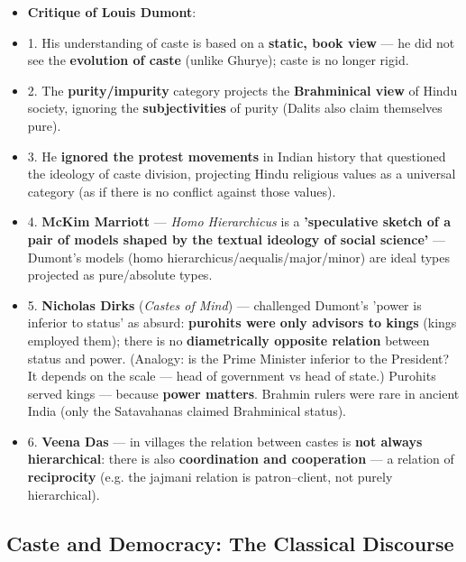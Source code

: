 \begin{CriticalPoint}
\begin{itemize}
\item \textbf{Critique of Louis Dumont}:
\item 1. His understanding of caste is based on a \textbf{static, book view} --- he did not see the \textbf{evolution of caste} (unlike Ghurye); caste is no longer rigid.
\item 2. The \textbf{purity/impurity} category projects the \textbf{Brahminical view} of Hindu society, ignoring the \textbf{subjectivities} of purity (Dalits also claim themselves pure).
\item 3. He \textbf{ignored the protest movements} in Indian history that questioned the ideology of caste division, projecting Hindu religious values as a universal category (as if there is no conflict against those values).
\item 4. \textbf{McKim Marriott} --- \emph{Homo Hierarchicus} is a \textbf{'speculative sketch of a pair of models shaped by the textual ideology of social science'} --- Dumont's models (homo hierarchicus/aequalis/major/minor) are ideal types projected as pure/absolute types.
\item 5. \textbf{Nicholas Dirks} (\emph{Castes of Mind}) --- challenged Dumont's 'power is inferior to status' as absurd: \textbf{purohits were only advisors to kings} (kings employed them); there is no \textbf{diametrically opposite relation} between status and power. (Analogy: is the Prime Minister inferior to the President? It depends on the scale --- head of government vs head of state.) Purohits served kings --- because \textbf{power matters}. Brahmin rulers were rare in ancient India (only the Satavahanas claimed Brahminical status).
\item 6. \textbf{Veena Das} --- in villages the relation between castes is \textbf{not always hierarchical}: there is also \textbf{coordination and cooperation} --- a relation of \textbf{reciprocity} (e.g. the jajmani relation is patron--client, not purely hierarchical).
\end{itemize}
\end{CriticalPoint}

\subsection{Caste and Democracy: The Classical Discourse}

